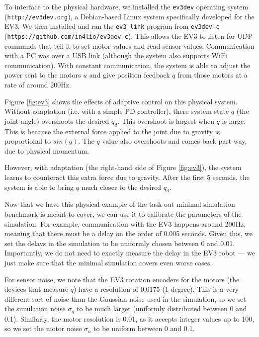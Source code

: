 \documentclass{frontiersSCNS} %
\begin{document}
To interface to the physical hardware, we installed the \texttt{ev3dev} operating
system (\texttt{http://ev3dev.org}), a Debian-based Linux system specifically developed
for the EV3.  We then installed and ran the \texttt{ev3\_link} program from \texttt{ev3dev-c}
(\texttt{https://github.com/in4lio/ev3dev-c}).  This allows the EV3 to listen for
UDP commands that tell it to set motor values and read sensor values.
Communication with a PC was over a USB link (although the system also
supports WiFi communication).  With constant communication, the system is
able to adjust the power sent to the motors $u$ and give position feedback
$q$ from those motors at a rate of around 200Hz.

Figure \ref{fig:ev3} shows the effects of adaptive control on this physical
system.  Without adaptation (i.e. with a simple PD controller), there system
state $q$ (the joint angle) overshoots the desired $q_d$.  This overshoot
is largest when $q$ is large.  This is because the external force applied to
the joint due to gravity is proportional to $sin(q)$.  The $q$ value also
overshoots and comes back part-way, due to physical momentum.

However, with adaptation (the right-hand side of Figure \ref{fig:ev3}),
the system learns to counteract this extra force due to gravity.  After
the first 5 seconds, the system is able to bring $q$ much closer to the
desired $q_d$.

Now that we have this physical example of the task out minimal simulation
benchmark is meant to cover, we can use it to calibrate the parameters of
the simulation.  For example, communication with the EV3 happens around
200Hz, meaning that there must be a delay on the order of 0.005 seconds.  Given
this, we set the delays in the simulation to be uniformly chosen between
0 and 0.01.  Importantly, we do not need to exactly measure the delay in the
EV3 robot --- we just make sure that the minimal simulation covers even worse
cases.

For sensor noise, we note that the EV3 rotation encoders for the motors (the
devices that measure $q$) have a resolution of 0.0175 (1 degree).  This is a
very different sort of noise than the Gaussian noise used in the simulation,
so we set the simulation noise $\sigma_q$ to be much larger (uniformly distributed
between 0 and 0.1).  Similarly, the motor resolution is 0.01, as it accepts 
integer values up to 100, so we set the motor noise $\sigma_u$ to be uniform between
0 and 0.1.
\end{document}
